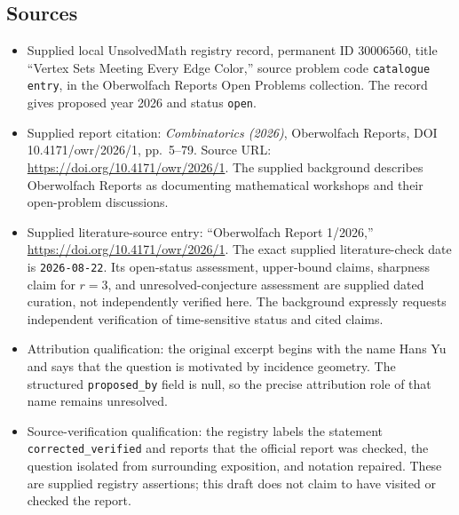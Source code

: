 \documentclass[11pt]{article}
\begin{document}
\subsection{Sources}
\begin{itemize}
\item Supplied local UnsolvedMath registry record, permanent ID \(30006560\), title ``Vertex Sets Meeting Every Edge Color,'' source problem code \texttt{catalogue entry}, in the Oberwolfach Reports Open Problems collection. The record gives proposed year 2026 and status \texttt{open}.
\item Supplied report citation: \emph{Combinatorics (2026)}, Oberwolfach Reports, DOI 10.4171/owr/2026/1, pp.\ 5--79. Source URL: \url{https://doi.org/10.4171/owr/2026/1}. The supplied background describes Oberwolfach Reports as documenting mathematical workshops and their open-problem discussions.
\item Supplied literature-source entry: ``Oberwolfach Report 1/2026,'' \url{https://doi.org/10.4171/owr/2026/1}. The exact supplied literature-check date is \texttt{2026-08-22}. Its open-status assessment, upper-bound claims, sharpness claim for \(r=3\), and unresolved-conjecture assessment are supplied dated curation, not independently verified here. The background expressly requests independent verification of time-sensitive status and cited claims.
\item Attribution qualification: the original excerpt begins with the name Hans Yu and says that the question is motivated by incidence geometry. The structured \texttt{proposed\_by} field is null, so the precise attribution role of that name remains unresolved.
\item Source-verification qualification: the registry labels the statement \texttt{corrected\_verified} and reports that the official report was checked, the question isolated from surrounding exposition, and notation repaired. These are supplied registry assertions; this draft does not claim to have visited or checked the report.
\end{itemize}
\end{document}

